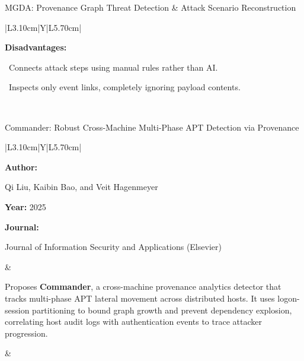 \begin{frame}[t]{MGDA: Provenance Graph Threat Detection \& Attack Scenario Reconstruction}
{\begin{tabularx}{\textwidth}{|L{3.10cm}|Y|L{5.70cm}|}
\begin{minipage}[t]{\linewidth}
\textcolor{limitRed}{\textbf{Disadvantages:}}\par\vspace{1.5pt}
\textbullet~Connects attack steps using manual rules rather than AI.\par\vspace{2.0pt}\textbullet~Inspects only event links, completely ignoring payload contents.\par\vspace{4pt}
\end{minipage} \\\hline
\end{tabularx}}
\end{frame}

\begin{frame}[t]{Commander: Robust Cross-Machine Multi-Phase APT Detection via Provenance}
\vspace{-0.30em}
{\footnotesize\setlength{\tabcolsep}{3.5pt}\renewcommand{\arraystretch}{1.10}
\begin{tabularx}{\textwidth}{|L{3.10cm}|Y|L{5.70cm}|}
\hline\lrhdr\hline
\begin{minipage}[t]{\linewidth}\fontsize{7.2pt}{9.2pt}\raggedright\selectfont
\textbf{Author:}\par
Qi Liu, Kaibin Bao, and Veit Hagenmeyer\par\vspace{4pt}
\textbf{Year:} 2025\par\vspace{4pt}
\textbf{Journal:}\par
Journal of Information Security and Applications (Elsevier)\par\vspace{4pt}
\end{minipage}
&
\begin{minipage}[t]{\linewidth}\fontsize{7.2pt}{9.2pt}\raggedright\selectfont
Proposes \textbf{Commander}, a cross-machine provenance analytics detector that tracks multi-phase APT lateral movement across distributed hosts. It uses logon-session partitioning to bound graph growth and prevent dependency explosion, correlating host audit logs with authentication events to trace attacker progression.\par\vspace{4pt}
\end{minipage}
&
\begin{minipage}[t]{\linewidth}\fontsize{7.2pt}{9.0pt}\raggedright\selectfont

\end{minipage}
\end{tabularx}}
\end{frame}
